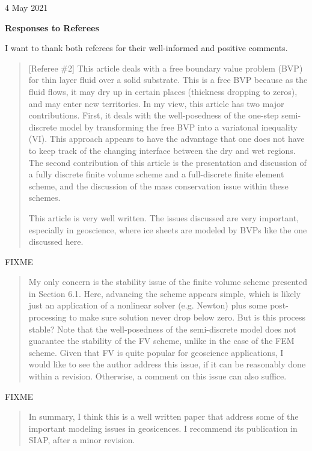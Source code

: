 \documentclass[12pt]{amsart}
\newcommand{\mm}{\medskip \noindent}
\begin{document}
\hfill 4 May 2021

\bigskip

\large\centerline{\textbf{Responses to Referees}}
\bigskip
\normalsize

\thispagestyle{empty}

I want to thank both referees for their well-informed and positive comments.

\begin{quote}
[Referee \#2] This article deals with a free boundary value problem (BVP) for thin layer fluid over a solid substrate.  This is a free BVP because as the fluid flows, it may dry up in certain places (thickness dropping to zeros), and may enter new territories.  In my view, this article has two major contributions.  First, it deals with the well-posedness of the one-step semi-discrete model by transforming the free BVP into a variatonal inequality (VI).  This approach appears to have the advantage that one does not have to keep track of the changing interface between the dry and wet regions.  The second contribution of this article is the presentation and discussion of a fully discrete finite volume scheme and a full-discrete finite element scheme, and the discussion of the mass conservation issue within these schemes.

\mm This article is very well written.  The issues discussed are very important, especially in geoscience, where ice sheets are modeled by BVPs like the one discussed here.  
\end{quote}

FIXME

\begin{quote}
My only concern is the stability issue of the finite volume scheme presented in Section 6.1. Here, advancing the scheme appears simple, which is likely just an application of a nonlinear solver (e.g. Newton) plus some post-processing to make sure solution never drop below zero. But is this process stable? Note that the well-posedness of the semi-discrete model does not guarantee the stability of the FV scheme, unlike in the case of the FEM scheme.  Given that FV is quite popular for geoscience applications, I would like to see the author address this issue, if it can be reasonably done within a revision. Otherwise, a comment on this issue can also suffice.
\end{quote}

FIXME

\begin{quote}
In summary, I think this is a well written paper that address some of the important modeling issues in geosicences.  I recommend its publication in SIAP, after a minor revision.
\end{quote}
\end{document}
